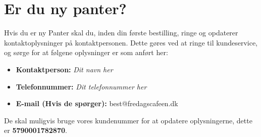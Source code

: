 \section{Er du ny panter?}
\label{sec:Er du ny Panter?}

Hvis du er ny Panter skal du, inden din første bestilling, ringe og opdaterer kontaktoplysninger på kontaktpersonen.
Dette gøres ved at ringe til \DRS kundeservice, og sørge for at følgene oplysninger er som anført her:

\begin{itemize}
	\item \textbf{Kontaktperson:} \textit{Dit navn her}
	\item \textbf{Telefonnummer:} \textit{Dit telefonnummer her}
	\item \textbf{E-mail (Hvis de spørger):} best@fredagscafeen.dk
\end{itemize}

De skal muligvis bruge vores kundenummer for at opdatere oplysningerne, dette er \textbf{5790001782870}.



